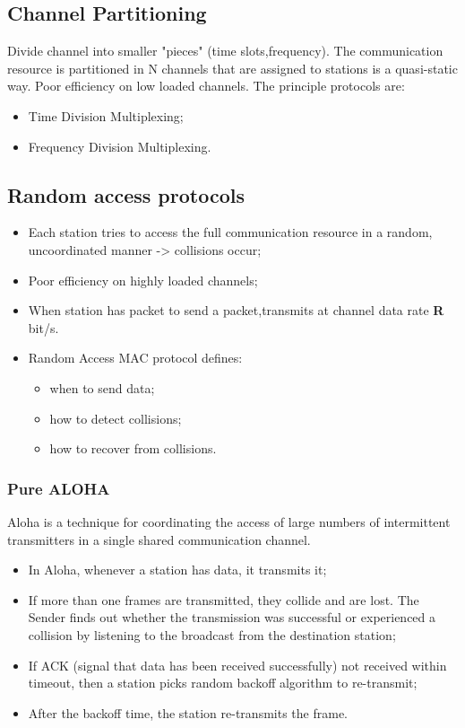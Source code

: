 \documentclass[../resumosRCOM.tex]{subfiles}
\begin{document}
\subsection{Channel Partitioning}
Divide channel into smaller "pieces" (time slots,frequency).
\newline
The communication resource is partitioned in N channels that are assigned to stations is a quasi-static way. 
\newline
Poor efficiency on low loaded channels.
\newline The principle protocols are:
\begin{itemize}
        \item Time Division Multiplexing;
        \item Frequency Division Multiplexing.
\end{itemize}
\subsection{Random access protocols}
\begin{itemize}
        \item Each station tries to access the full communication resource in a random, uncoordinated manner -> collisions occur;
        \item Poor efficiency on highly loaded channels;
        \item When station has packet to send a packet,transmits at channel data rate \textbf{R} bit/s.
        \item Random Access MAC protocol defines:
        \begin{itemize}
        \item when to send data;
        \item how to detect collisions;
        \item how to recover from collisions.
\end{itemize}
\end{itemize}

\subsubsection{Pure ALOHA}
Aloha is a technique for coordinating the access of large numbers of intermittent transmitters in a single shared communication channel.
\newline
\begin{itemize}
\item In Aloha, whenever a station has data, it transmits it;
\item If more than one frames are transmitted, they collide and are lost. The Sender finds out whether the transmission was successful or experienced a collision by listening to the broadcast from the
destination station;
\item If ACK (signal that data has been received successfully) not received within timeout, then a station picks random backoff algorithm to re-transmit;
\item After the backoff time, the station re-transmits the frame.
\end{itemize}
\end{document}
